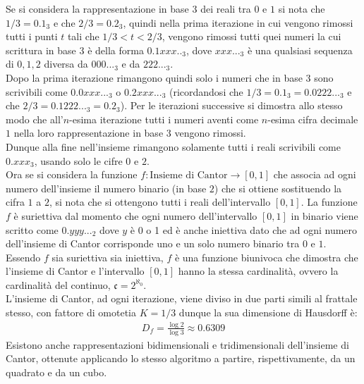 \documentclass[10pt]{report}
\begin{document}
			Se si considera la rappresentazione in base $3$ dei reali tra $0$ e $1$ si nota che $1/3 = 0.1_3$ e che $2/3 = 0.2_3$, quindi nella prima iterazione in cui vengono rimossi tutti i punti $t$ tali che $1/3 < t < 2/3$, vengono rimossi tutti quei numeri la cui scrittura in base $3$ è della forma $0.1xxx.._3$, dove $xxx..._3$ è una qualsiasi sequenza di $0, 1, 2$ diversa da $000..._3$ e da $222..._3$.\\
			Dopo la prima iterazione rimangono quindi solo i numeri che in base $3$ sono scrivibili come $0.0xxx..._3$ o $0.2xxx..._3$ (ricordandosi che $1/3 = 0.1_3 = 0.0222..._3$ e che $2/3 = 0.1222..._3 = 0.2_3$). Per le iterazioni successive si dimostra allo stesso modo che all'$n$-esima iterazione tutti i numeri aventi come $n$-esima cifra decimale $1$ nella loro rappresentazione in base $3$ vengono rimossi.\\
			Dunque alla fine nell'insieme rimangono solamente tutti i reali scrivibili come $0.xxx_3$, usando solo le cifre $0$ e $2$. \\
			Ora se si considera la funzione $f: \mbox{Insieme di Cantor} \to [0, 1]$ che associa ad ogni numero dell'insieme il numero binario (in base $2$) che si ottiene sostituendo la cifra $1$ a $2$, si nota che si ottengono tutti i reali dell'intervallo $[0, 1]$.
			La funzione $f$ è suriettiva dal momento che ogni numero dell'intervallo $[0, 1]$ in binario viene scritto come $0.yyy..._2$ dove $y$ è 0 o 1 ed è anche iniettiva dato che ad ogni numero dell'insieme di Cantor corrisponde uno e un solo numero binario tra $0$ e $1$.\\
			Essendo $f$ sia suriettiva sia iniettiva, $f$ è una funzione biunivoca che dimostra che l'insieme di Cantor e l'intervallo $[0, 1]$ hanno la stessa cardinalità, ovvero la cardinalità del continuo, $\mathfrak{c} = 2^{\aleph_0}$.\\
			L'insieme di Cantor, ad ogni iterazione, viene diviso in due parti simili al frattale stesso, con fattore di omotetia $K=1/3$ dunque la sua dimensione di Hausdorff è:
			\begin{gather*}
				D_f = \frac{\log 2}{\log 3} \approx 0.6309
			\end{gather*}
			Esistono anche rappresentazioni bidimensionali e tridimensionali dell'insieme di Cantor, ottenute applicando lo stesso algoritmo a partire, rispettivamente, da un quadrato e da un cubo.
			
\end{document}
